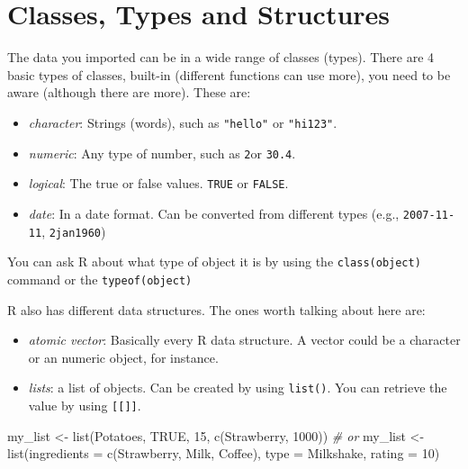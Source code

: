 \documentclass[
]{book}
\newenvironment{Shaded}{\begin{snugshade}}{\end{snugshade}}
\newcommand{\AttributeTok}[1]{\textcolor[rgb]{0.77,0.63,0.00}{#1}}
\newcommand{\CommentTok}[1]{\textcolor[rgb]{0.56,0.35,0.01}{\textit{#1}}}
\newcommand{\ConstantTok}[1]{\textcolor[rgb]{0.00,0.00,0.00}{#1}}
\newcommand{\DecValTok}[1]{\textcolor[rgb]{0.00,0.00,0.81}{#1}}
\newcommand{\FunctionTok}[1]{\textcolor[rgb]{0.00,0.00,0.00}{#1}}
\newcommand{\NormalTok}[1]{#1}
\newcommand{\OtherTok}[1]{\textcolor[rgb]{0.56,0.35,0.01}{#1}}
\newcommand{\StringTok}[1]{\textcolor[rgb]{0.31,0.60,0.02}{#1}}
\begin{document}
\hypertarget{classes-types-and-structures}{%
\section{Classes, Types and Structures}\label{classes-types-and-structures}}

The data you imported can be in a wide range of classes (types).
There are 4 basic types of classes, built-in (different functions can use more), you need to be aware (although there are more).
These are:

\begin{itemize}
\item
  \emph{character}: Strings (words), such as \texttt{"hello"} or \texttt{"hi123"}.\\
\item
  \emph{numeric}: Any type of number, such as \texttt{2}or \texttt{30.4}.\\
\item
  \emph{logical}: The true or false values.
  \texttt{TRUE} or \texttt{FALSE}.
\item
  \emph{date}: In a date format.
  Can be converted from different types (e.g., \texttt{2007-11-11}, \texttt{2jan1960})
\end{itemize}

You can ask R about what type of object it is by using the \texttt{class(object)} command or the \texttt{typeof(object)}

R also has different data structures.
The ones worth talking about here are:

\begin{itemize}
\item
  \emph{atomic vector}: Basically every R data structure.
  A vector could be a character or an numeric object, for instance.
\item
  \emph{lists}: a list of objects.
  Can be created by using \texttt{list()}.
  You can retrieve the value by using \texttt{{[}{[}{]}{]}}.
\end{itemize}

\begin{Shaded}
\begin{Highlighting}[]
\NormalTok{my\_list }\OtherTok{\textless{}{-}} \FunctionTok{list}\NormalTok{(}\StringTok{\textquotesingle{}Potatoes\textquotesingle{}}\NormalTok{, }\ConstantTok{TRUE}\NormalTok{, }\DecValTok{15}\NormalTok{, }\FunctionTok{c}\NormalTok{(}\StringTok{\textquotesingle{}Strawberry\textquotesingle{}}\NormalTok{, }\DecValTok{1000}\NormalTok{))}
\CommentTok{\# or}
\NormalTok{my\_list }\OtherTok{\textless{}{-}} \FunctionTok{list}\NormalTok{(}\AttributeTok{ingredients =} \FunctionTok{c}\NormalTok{(}\StringTok{\textquotesingle{}Strawberry\textquotesingle{}}\NormalTok{, }\StringTok{\textquotesingle{}Milk\textquotesingle{}}\NormalTok{, }\StringTok{\textquotesingle{}Coffee\textquotesingle{}}\NormalTok{), }\AttributeTok{type =} \StringTok{\textquotesingle{}Milkshake\textquotesingle{}}\NormalTok{, }\AttributeTok{rating =} \DecValTok{10}\NormalTok{)}
\end{Highlighting}
\end{Shaded}
\end{document}
